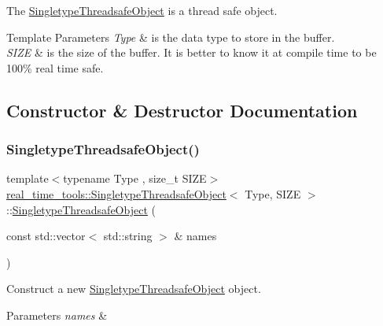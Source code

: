 The \hyperlink{classreal__time__tools_1_1SingletypeThreadsafeObject}{Singletype\+Threadsafe\+Object} is a thread safe object. 


\begin{DoxyTemplParams}{Template Parameters}
{\em Type} & is the data type to store in the buffer. \\
\hline
{\em S\+I\+ZE} & is the size of the buffer. It is better to know it at compile time to be 100\% real time safe. \\
\hline
\end{DoxyTemplParams}


\subsection{Constructor \& Destructor Documentation}
\mbox{\label{classreal__time__tools_1_1SingletypeThreadsafeObject_ad33b8afc1581cc7adea5881c9d775128}} 
\subsubsection{\texorpdfstring{Singletype\+Threadsafe\+Object()}{SingletypeThreadsafeObject()}}
{\footnotesize\ttfamily template$<$typename Type , size\+\_\+t S\+I\+ZE$>$ \\
\hyperlink{classreal__time__tools_1_1SingletypeThreadsafeObject}{real\+\_\+time\+\_\+tools\+::\+Singletype\+Threadsafe\+Object}$<$ Type, S\+I\+ZE $>$\+::\hyperlink{classreal__time__tools_1_1SingletypeThreadsafeObject}{Singletype\+Threadsafe\+Object} (\begin{DoxyParamCaption}\item[{const std\+::vector$<$ std\+::string $>$ \&}]{names }\end{DoxyParamCaption})}



Construct a new \hyperlink{classreal__time__tools_1_1SingletypeThreadsafeObject}{Singletype\+Threadsafe\+Object} object. 


\begin{DoxyParams}{Parameters}
{\em names} & \\
\hline
\end{DoxyParams}


